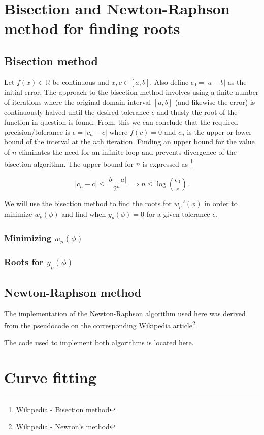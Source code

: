 \section{Bisection and Newton-Raphson method for finding roots}

\subsection{Bisection method}

Let $f(x)\in \mathbb{R}$ be continuous and $x,c\in [a,b]$. Also define $\epsilon_0=|a-b|$ as the initial error. The approach to the bisection method involves using a finite number of iterations where the original domain interval $[a,b]$ (and likewise the error) is continuously halved until the desired tolerance $\epsilon$ and thusly the root of the function in question is found.
From, this we can conclude that the required precision/tolerance is $\epsilon=|c_n-c|$ where $f(c)=0$ and $c_n$ is the upper or lower bound of the interval at the $n$th iteration.
Finding an upper bound for the value of $n$ eliminates the need for an infinite loop and prevents divergence of the bisection algorithm. The upper bound for $n$ is expressed as \footnote{\href{https://en.wikipedia.org/wiki/Bisection_method}{Wikipedia - Bisection method}}

\begin{equation}
    |c_n-c|\leq \frac{|b-a|}{2^n}\implies n\leq \log(\frac{\epsilon_0}{\epsilon}).
\end{equation}

We will use the bisection method to find the roots for $w_p\,'(\phi)$ in order to minimize $w_p(\phi)$ and find when $y_p(\phi)=0$ for a given tolerance $\epsilon$.

\subsubsection{Minimizing \texorpdfstring{$w_p(\phi)$}{}}

\subsubsection{Roots for \texorpdfstring{$y_p(\phi)$}{}}

\subsection{Newton-Raphson method}

The implementation of the Newton-Raphson algorithm used here was derived from the pseudocode on the
corresponding Wikipedia article\footnote{\href{https://en.wikipedia.org/wiki/Newtons_method}{Wikipedia - Newton's method}}.

The code used to implement both algorithms is located here.

\section{Curve fitting}